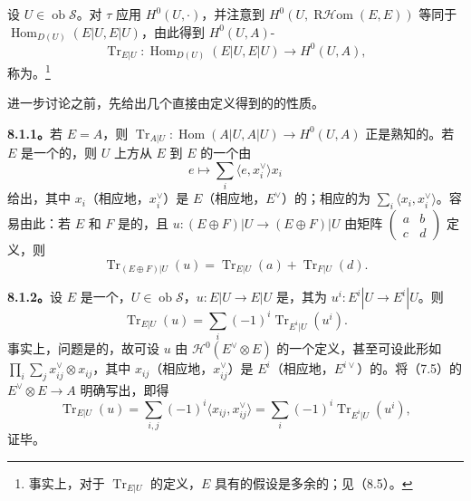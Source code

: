 设 $U\in\operatorname{ob}\mathscr S$。对 $\tau$ 应用 $H^0(U,\cdot)$，并注意到 $H^0(U,\operatorname{R\mathcal Hom}(E,E))$ 等同于 $\operatorname{Hom}_{D(U)}(E|U,E|U)$，由此得到 $H^0(U,A)$-
\[\operatorname{Tr}_{E|U}:\operatorname{Hom}_{D(U)}(E|U,E|U)\longrightarrow H^0(U,A),\]
称为。\footnote{事实上，对于 $\operatorname{Tr}_{E|U}$ 的定义，$E$ 具有的假设是多余的；见（8.5）。}

进一步讨论之前，先给出几个直接由定义得到的的性质。

\textbf{8.1.1。}若 $E=A$，则 $\operatorname{Tr}_{A|U}:\operatorname{Hom}(A|U,A|U)\to H^0(U,A)$ 正是熟知的。若 $E$ 是一个的，则 $U$ 上方从 $E$ 到 $E$ 的一个由
\[e\longmapsto\sum_i\langle e,x_i^\vee\rangle x_i\]
给出，其中 $x_i$（相应地，$x_i^\vee$）是 $E$（相应地，$E^\vee$）的；相应的为 $\sum_i\langle x_i,x_i^\vee\rangle$。容易由此：若 $E$ 和 $F$ 是的，且 $u:(E\oplus F)|U\to(E\oplus F)|U$ 由矩阵 $\begin{pmatrix}a&b\\c&d\end{pmatrix}$ 定义，则
\[\operatorname{Tr}_{(E\oplus F)|U}(u)=\operatorname{Tr}_{E|U}(a)+\operatorname{Tr}_{F|U}(d).\]

\textbf{8.1.2。}设 $E$ 是一个，$U\in\operatorname{ob}\mathscr S$，$u:E|U\to E|U$ 是，其为 $u^i:E^i|U\to E^i|U$。则
\[\operatorname{Tr}_{E|U}(u)=\sum_i(-1)^i\operatorname{Tr}_{E^i|U}(u^i).\]
事实上，问题是的，故可设 $u$ 由 $\mathcal H^0(E^\vee\otimes E)$ 的一个定义，甚至可设此形如 $\prod_i\sum_j x_{ij}^\vee\otimes x_{ij}$，其中 $x_{ij}$（相应地，$x_{ij}^\vee$）是 $E^i$（相应地，$E^{i\vee}$）的。将（7.5）的 $E^\vee\otimes E\to A$ 明确写出，即得
\[\operatorname{Tr}_{E|U}(u)=\sum_{i,j}(-1)^i\langle x_{ij},x_{ij}^\vee\rangle=\sum_i(-1)^i\operatorname{Tr}_{E^i|U}(u^i),\]
证毕。

